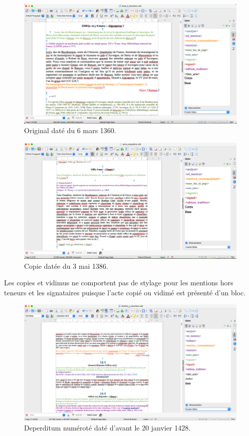 \begin{figure}[H]
    \centering
    \includegraphics[scale=0.3]{front/images/original.png}
    \caption{Original daté du 6 mars 1360.}
    \label{fig:original}
\end{figure}

\begin{figure}[H]
    \centering
    \includegraphics[scale=0.3]{front/images/copie.png}
    \caption{Copie datée du 3 mai 1386.}
    \label{fig:copie}
\end{figure}

\par Les copies et vidimus ne comportent pas de stylage pour les mentions hors teneurs et les signataires puisque l'acte copié ou vidimé est présenté d'un bloc. 

\begin{figure}[H]
    \centering
    \includegraphics[scale=0.3]{front/images/deperditum_numerote.png}
    \caption{Deperditum numéroté daté d'avant le 20 janvier 1428.}
    \label{fig:dep_num}
\end{figure}

